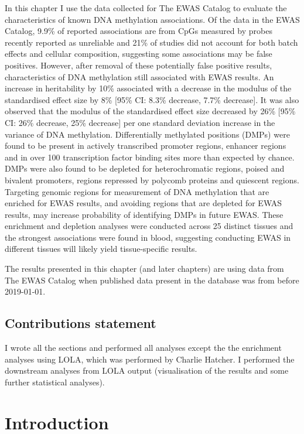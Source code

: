 \documentclass[11pt,twoside]{bristolthesis}
\begin{document}
In this chapter I use the data collected for The EWAS Catalog to evaluate the characteristics of known DNA methylation associations. Of the data in the EWAS Catalog, 9.9\% of reported associations are from CpGs measured by probes recently reported as unreliable and 21\% of studies did not account for both batch effects and cellular composition, suggesting some associations may be false positives. However, after removal of these potentially false positive results, characteristics of DNA methylation still associated with EWAS results. An increase in heritability by 10\% associated with a decrease in the modulus of the standardised effect size by 8\% {[}95\% CI: 8.3\% decrease, 7.7\% decrease{]}. It was also observed that the modulus of the standardised effect size decreased by 26\% {[}95\% CI: 26\% decrease, 25\% decrease{]} per one standard deviation increase in the variance of DNA methylation. Differentially methylated positions (DMPs) were found to be present in actively transcribed promoter regions, enhancer regions and in over 100 transcription factor binding sites more than expected by chance. DMPs were also found to be depleted for heterochromatic regions, poised and bivalent promoters, regions repressed by polycomb proteins and quiescent regions. Targeting genomic regions for measurement of DNA methylation that are enriched for EWAS results, and avoiding regions that are depleted for EWAS results, may increase probability of identifying DMPs in future EWAS. These enrichment and depletion analyses were conducted across 25 distinct tissues and the strongest associations were found in blood, suggesting conducting EWAS in different tissues will likely yield tissue-specific results.

The results presented in this chapter (and later chapters) are using data from The EWAS Catalog when published data present in the database was from before 2019-01-01.

\hypertarget{contributions-statement-04}{%
\subsection{Contributions statement}\label{contributions-statement-04}}

I wrote all the sections and performed all analyses except the the enrichment analyses using LOLA, which was performed by Charlie Hatcher. I performed the downstream analyses from LOLA output (visualisation of the results and some further statistical analyses).

\hypertarget{introduction-04}{%
\section{Introduction}\label{introduction-04}}
\end{document}
